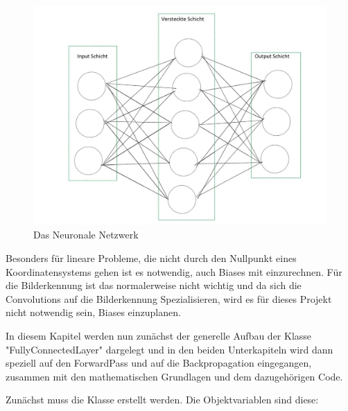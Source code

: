 \documentclass[12pt]{article}
\begin{document}
\begin{figure}[H]
\centering
\includegraphics[scale=0.50]{./Images/002_FeedForwardNetzwerk.jpg}
\caption{Das Neuronale Netzwerk}
\label{Das Neuronale Netzwerk}
\end{figure}

Besonders für lineare Probleme, die nicht durch den Nullpunkt eines Koordinatensystems gehen ist es notwendig, auch Biases mit einzurechnen. Für die Bilderkennung ist das normalerweise nicht wichtig und da sich die Convolutions auf die Bilderkennung Spezialisieren, wird es für dieses Projekt nicht notwendig sein, Biases einzuplanen.

In diesem Kapitel werden nun zunächst der generelle Aufbau der Klasse "FullyConnectedLayer" dargelegt und in den beiden Unterkapiteln wird dann speziell auf den ForwardPass und auf die Backpropagation eingegangen, zusammen mit den mathematischen Grundlagen und dem dazugehörigen Code.

Zunächst muss die Klasse erstellt werden. Die Objektvariablen sind diese:
    
\end{document}
